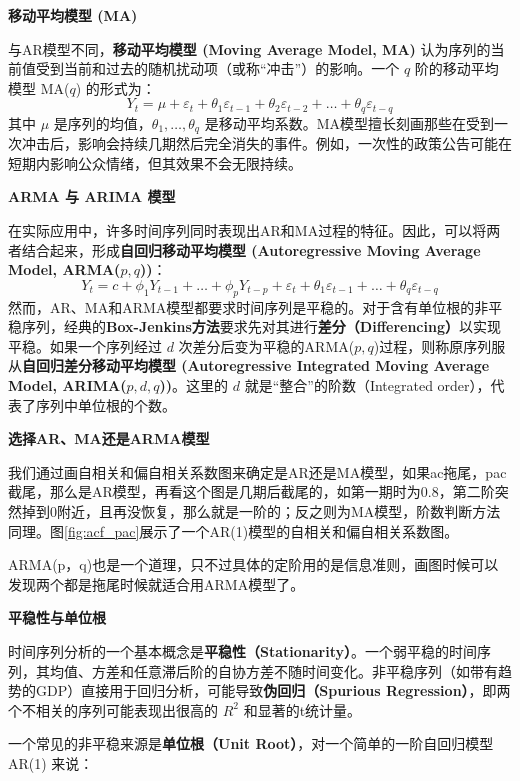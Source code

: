 \textbf{移动平均模型 (MA)}

与AR模型不同，\textbf{移动平均模型 (Moving Average Model, MA)} 认为序列的当前值受到当前和过去的随机扰动项（或称“冲击”）的影响。一个 $q$ 阶的移动平均模型 MA($q$) 的形式为：
\begin{equation}
	Y_t = \mu + \varepsilon_t + \theta_1 \varepsilon_{t-1} + \theta_2 \varepsilon_{t-2} + \dots + \theta_q \varepsilon_{t-q}
\end{equation}
其中 $\mu$ 是序列的均值，$\theta_1, \dots, \theta_q$ 是移动平均系数。MA模型擅长刻画那些在受到一次冲击后，影响会持续几期然后完全消失的事件。例如，一次性的政策公告可能在短期内影响公众情绪，但其效果不会无限持续。

\textbf{ARMA 与 ARIMA 模型}

在实际应用中，许多时间序列同时表现出AR和MA过程的特征。因此，可以将两者结合起来，形成\textbf{自回归移动平均模型 (Autoregressive Moving Average Model, ARMA($p,q$))}：
\begin{equation}
	Y_t = c + \phi_1 Y_{t-1} + \dots + \phi_p Y_{t-p} + \varepsilon_t + \theta_1 \varepsilon_{t-1} + \dots + \theta_q \varepsilon_{t-q}
\end{equation}
然而，AR、MA和ARMA模型都要求时间序列是平稳的。对于含有单位根的非平稳序列，经典的\textbf{Box-Jenkins方法}要求先对其进行\textbf{差分（Differencing）}以实现平稳。如果一个序列经过 $d$ 次差分后变为平稳的ARMA($p,q$)过程，则称原序列服从\textbf{自回归差分移动平均模型 (Autoregressive Integrated Moving Average Model, ARIMA($p,d,q$))}。这里的 $d$ 就是“整合”的阶数（Integrated order），代表了序列中单位根的个数。

\textbf{选择AR、MA还是ARMA模型}

我们通过画自相关和偏自相关系数图来确定是AR还是MA模型，如果ac拖尾，pac截尾，那么是AR模型，再看这个图是几期后截尾的，如第一期时为0.8，第二阶突然掉到0附近，且再没恢复，那么就是一阶的；反之则为MA模型，阶数判断方法同理。图\ref{fig:acf_pac}展示了一个AR(1)模型的自相关和偏自相关系数图。

ARMA(p，q)也是一个道理，只不过具体的定阶用的是信息准则，画图时候可以发现两个都是拖尾时候就适合用ARMA模型了。

\textbf{平稳性与单位根}

时间序列分析的一个基本概念是\textbf{平稳性（Stationarity）}。一个弱平稳的时间序列，其均值、方差和任意滞后阶的自协方差不随时间变化。非平稳序列（如带有趋势的GDP）直接用于回归分析，可能导致\textbf{伪回归（Spurious Regression）}，即两个不相关的序列可能表现出很高的 $R^2$ 和显著的t统计量。

一个常见的非平稳来源是\textbf{单位根（Unit Root）}，对一个简单的一阶自回归模型 AR(1) 来说：

